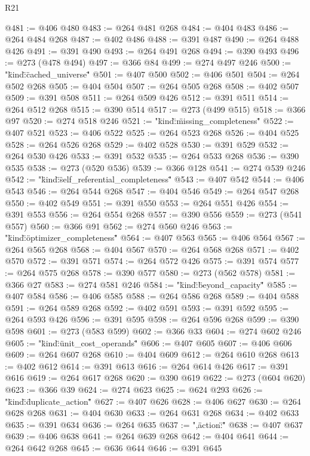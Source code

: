 \begin{lexlean}{R21}
\begin{coremodule}
{{{@481 := @406 @480
@483 := @264 @481 @268
@484 := @404 @483
@486 := @264 @484 @268
@487 := @402 @486
@488 := @391 @487
@490 := @264 @488 @426
@491 := @391 @490
@493 := @264 @491 @268
@494 := @390 @493
@496 := @273 (@478 @494)
@497 := @366 @84
@499 := @274 @497 @246
@500 := "{\"kind\":\"cached_universe\""
@501 := @407 @500
@502 := @406 @501
@504 := @264 @502 @268
@505 := @404 @504
@507 := @264 @505 @268
@508 := @402 @507
@509 := @391 @508
@511 := @264 @509 @426
@512 := @391 @511
@514 := @264 @512 @268
@515 := @390 @514
@517 := @273 (@499 @515)
@518 := @366 @97
@520 := @274 @518 @246
@521 := "{\"kind\":\"missing_completeness\""
@522 := @407 @521
@523 := @406 @522
@525 := @264 @523 @268
@526 := @404 @525
@528 := @264 @526 @268
@529 := @402 @528
@530 := @391 @529
@532 := @264 @530 @426
@533 := @391 @532
@535 := @264 @533 @268
@536 := @390 @535
@538 := @273 (@520 @536)
@539 := @366 @128
@541 := @274 @539 @246
@542 := "{\"kind\":\"self_referential_completeness\""
@543 := @407 @542
@544 := @406 @543
@546 := @264 @544 @268
@547 := @404 @546
@549 := @264 @547 @268
@550 := @402 @549
@551 := @391 @550
@553 := @264 @551 @426
@554 := @391 @553
@556 := @264 @554 @268
@557 := @390 @556
@559 := @273 (@541 @557)
@560 := @366 @91
@562 := @274 @560 @246
@563 := "{\"kind\":\"optimizer_completeness\""
@564 := @407 @563
@565 := @406 @564
@567 := @264 @565 @268
@568 := @404 @567
@570 := @264 @568 @268
@571 := @402 @570
@572 := @391 @571
@574 := @264 @572 @426
@575 := @391 @574
@577 := @264 @575 @268
@578 := @390 @577
@580 := @273 (@562 @578)
@581 := @366 @27
@583 := @274 @581 @246
@584 := "{\"kind\":\"beyond_capacity\""
@585 := @407 @584
@586 := @406 @585
@588 := @264 @586 @268
@589 := @404 @588
@591 := @264 @589 @268
@592 := @402 @591
@593 := @391 @592
@595 := @264 @593 @426
@596 := @391 @595
@598 := @264 @596 @268
@599 := @390 @598
@601 := @273 (@583 @599)
@602 := @366 @33
@604 := @274 @602 @246
@605 := "{\"kind\":\"unit_cost_operands\""
@606 := @407 @605
@607 := @406 @606
@609 := @264 @607 @268
@610 := @404 @609
@612 := @264 @610 @268
@613 := @402 @612
@614 := @391 @613
@616 := @264 @614 @426
@617 := @391 @616
@619 := @264 @617 @268
@620 := @390 @619
@622 := @273 (@604 @620)
@623 := @366 @39
@624 := @274 @623
@625 := @624 @293
@626 := "{\"kind\":\"duplicate_action\""
@627 := @407 @626
@628 := @406 @627
@630 := @264 @628 @268
@631 := @404 @630
@633 := @264 @631 @268
@634 := @402 @633
@635 := @391 @634
@636 := @264 @635
@637 := ",\"action\":\""
@638 := @407 @637
@639 := @406 @638
@641 := @264 @639 @268
@642 := @404 @641
@644 := @264 @642 @268
@645 := @636 @644
@646 := @391 @645
}}}}}}}}}}
\end{coremodule}
\end{lexlean}
